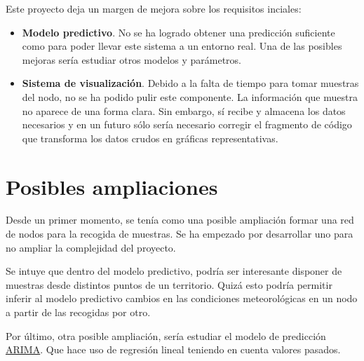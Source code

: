 Este proyecto deja un margen de mejora sobre los requisitos inciales:
\begin{itemize}
\item \textbf{Modelo predictivo}. No se ha logrado obtener una predicción suficiente como para poder llevar este sistema a un entorno real. Una de las posibles mejoras sería estudiar otros modelos y parámetros.

\item \textbf{Sistema de visualización}. Debido a la falta de tiempo para tomar muestras del nodo, no se ha podido pulir este componente. La información que muestra no aparece de una forma clara. Sin embargo, sí recibe y almacena los datos necesarios y en un futuro sólo sería necesario corregir el fragmento de código que transforma los datos crudos en gráficas representativas.
\end{itemize}

\section{Posibles ampliaciones}
Desde un primer momento, se tenía como una posible ampliación formar una red de nodos para la recogida de muestras. Se ha empezado por desarrollar uno para no ampliar la complejidad del proyecto.

Se intuye que dentro del modelo predictivo, podría ser interesante disponer de muestras desde distintos puntos de un territorio. Quizá esto podría permitir inferir al modelo predictivo cambios en las condiciones meteorológicas en un nodo a partir de las recogidas por otro.

Por último, otra posible ampliación, sería estudiar el modelo de predicción \href{https://www.analyticsvidhya.com/blog/2016/02/time-series-forecasting-codes-python/}{ARIMA}. Que hace uso de regresión lineal teniendo en cuenta valores pasados.